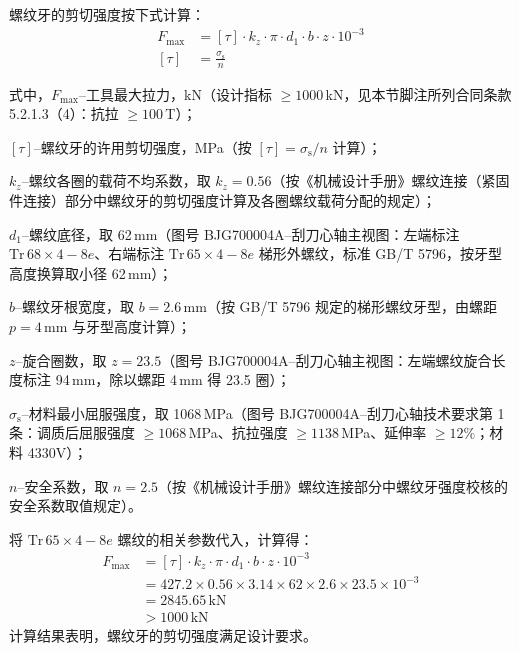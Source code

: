 螺纹牙的剪切强度按下式计算：
\begin{equation}
	\begin{aligned}
	    F_{\max} &= [\tau] \cdot k_z \cdot \pi \cdot d_1 \cdot b \cdot z \cdot 10^{-3} \\
	    [\tau] &= \frac{\sigma_{\mathrm{s}}}{n}
	\end{aligned}
	\end{equation}
	
式中，$F_{\max}$--工具最大拉力，kN（设计指标 $\ge 1000$\,kN，见本节脚注所列合同条款 5.2.1.3（4）：抗拉 $\ge 100$\,T）；

$[\tau]$--螺纹牙的许用剪切强度，MPa（按 $[\tau]=\sigma_{\mathrm{s}}/n$ 计算）；

$k_z$--螺纹各圈的载荷不均系数，取 $k_z = 0.56$（按《机械设计手册》螺纹连接（紧固件连接）部分中螺纹牙的剪切强度计算及各圈螺纹载荷分配的规定\cite{ref26}）；

$d_1$--螺纹底径，取 62\,mm（图号 BJG700004A--刮刀心轴主视图：左端标注 $\mathrm{Tr}\,68\times4-8e$、右端标注 $\mathrm{Tr}\,65\times4-8e$ 梯形外螺纹，标准 GB/T 5796，按牙型高度换算取小径 62\,mm）；

$b$--螺纹牙根宽度，取 $b = 2.6\,\text{mm}$（按 GB/T 5796 规定的梯形螺纹牙型，由螺距 $p=4\,\text{mm}$ 与牙型高度计算）；

$z$--旋合圈数，取 $z = 23.5$（图号 BJG700004A--刮刀心轴主视图：左端螺纹旋合长度标注 94\,mm，除以螺距 4\,mm 得 23.5 圈）；

$\sigma_{\mathrm{s}}$--材料最小屈服强度，取 1068\,MPa（图号 BJG700004A--刮刀心轴技术要求第 1 条：调质后屈服强度 $\ge 1068$\,MPa、抗拉强度 $\ge 1138$\,MPa、延伸率 $\ge 12\%$；材料 4330V）；

$n$--安全系数，取 $n = 2.5$（按《机械设计手册》螺纹连接部分中螺纹牙强度校核的安全系数取值规定\cite{ref26}）。

将 $\mathrm{Tr}\,65 \times 4-8e$ 螺纹的相关参数代入，计算得：
\begin{equation}
    \begin{aligned}
    F_{\max} &= [\tau] \cdot k_z \cdot \pi \cdot d_1 \cdot b \cdot z \cdot 10^{-3} \\
             &= 427.2 \times 0.56 \times 3.14 \times 62 \times 2.6 \times 23.5 \times 10^{-3} \\
             &= 2845.65\,\mathrm{kN} \\
             &> 1000\,\mathrm{kN}
    \end{aligned}
\end{equation}
计算结果表明，螺纹牙的剪切强度满足设计要求。


